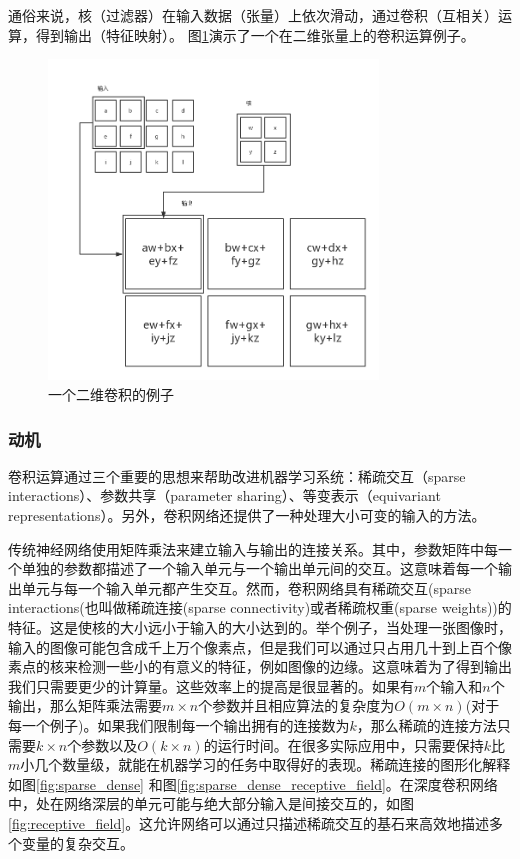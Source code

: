 \documentclass[12pt,a4paper,titlepage]{article}
\begin{document}
通俗来说，核（过滤器）在输入数据（张量）上依次滑动，通过卷积（互相关）运算，得到输出（特征映射）。
图\ref{fig:conv}演示了一个在二维张量上的卷积运算例子。
\begin{figure}[ht]

\centering
\includegraphics[height=8.5cm]{img/convolution.png}
\caption{一个二维卷积的例子}
\label{fig:conv}
\end{figure}

\subsubsection*{动机}
卷积运算通过三个重要的思想来帮助改进机器学习系统：稀疏交互（sparse interactions）、参数共享（parameter sharing）、等变表示（equivariant representations）。另外，卷积网络还提供了一种处理大小可变的输入的方法。\par
传统神经网络使用矩阵乘法来建立输入与输出的连接关系。其中，参数矩阵中每一个单独的参数都描述了一个输入单元与一个输出单元间的交互。这意味着每一个输出单元与每一个输入单元都产生交互。然而，卷积网络具有稀疏交互(sparse interactions(也叫做稀疏连接(sparse connectivity)或者稀疏权重(sparse weights))的特征。这是使核的大小远小于输入的大小达到的。举个例子，当处理一张图像时，输入的图像可能包含成千上万个像素点，但是我们可以通过只占用几十到上百个像素点的核来检测一些小的有意义的特征，例如图像的边缘。这意味着为了得到输出我们只需要更少的计算量。这些效率上的提高是很显著的。如果有$m$个输入和$n$个输出，那么矩阵乘法需要$m \times n$个参数并且相应算法的复杂度为$O(m \times n)$(对于每一个例子)。如果我们限制每一个输出拥有的连接数为$k$，那么稀疏的连接方法只需要$k \times n$个参数以及$O(k\times n)$的运行时间。在很多实际应用中，只需要保持$k$比$m$小几个数量级，就能在机器学习的任务中取得好的表现。稀疏连接的图形化解释如图\ref{fig:sparse_dense} 和图\ref{fig:sparse_dense_receptive_field}。在深度卷积网络中，处在网络深层的单元可能与绝大部分输入是间接交互的，如图\ref{fig:receptive_field}。这允许网络可以通过只描述稀疏交互的基石来高效地描述多个变量的复杂交互。
\end{document}

